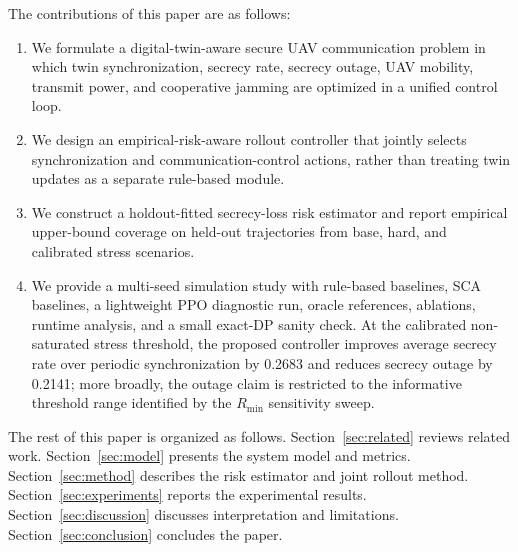 The contributions of this paper are as follows:
\begin{enumerate}
    \item We formulate a digital-twin-aware secure UAV communication problem in which twin synchronization, secrecy rate, secrecy outage, UAV mobility, transmit power, and cooperative jamming are optimized in a unified control loop.
    \item We design an empirical-risk-aware rollout controller that jointly selects synchronization and communication-control actions, rather than treating twin updates as a separate rule-based module.
    \item We construct a holdout-fitted secrecy-loss risk estimator and report empirical upper-bound coverage on held-out trajectories from base, hard, and calibrated stress scenarios.
    \item We provide a multi-seed simulation study with rule-based baselines, SCA baselines, a lightweight PPO diagnostic run, oracle references, ablations, runtime analysis, and a small exact-DP sanity check. At the calibrated non-saturated stress threshold, the proposed controller improves average secrecy rate over periodic synchronization by 0.2683 and reduces secrecy outage by 0.2141; more broadly, the outage claim is restricted to the informative threshold range identified by the $R_{\min}$ sensitivity sweep.
\end{enumerate}

The rest of this paper is organized as follows. Section~\ref{sec:related} reviews related work. Section~\ref{sec:model} presents the system model and metrics. Section~\ref{sec:method} describes the risk estimator and joint rollout method. Section~\ref{sec:experiments} reports the experimental results. Section~\ref{sec:discussion} discusses interpretation and limitations. Section~\ref{sec:conclusion} concludes the paper.
